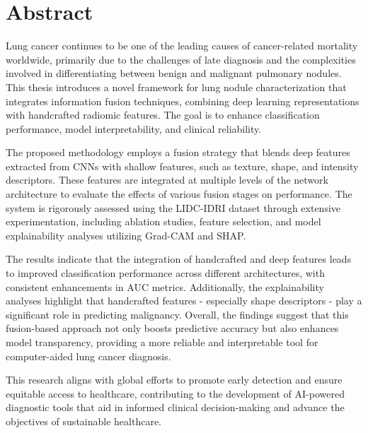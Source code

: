 \chapter*{Abstract}
Lung cancer continues to be one of the leading causes of cancer-related mortality worldwide, primarily due to the challenges of late diagnosis and the complexities involved in differentiating between benign and malignant pulmonary nodules. This thesis introduces a novel framework for lung nodule characterization that integrates information fusion techniques, combining deep learning representations with handcrafted radiomic features. The goal is to enhance classification performance, model interpretability, and clinical reliability.

The proposed methodology employs a fusion strategy that blends deep features extracted from CNNs with shallow features, such as texture, shape, and intensity descriptors. These features are integrated at multiple levels of the network architecture to evaluate the effects of various fusion stages on performance. The system is rigorously assessed using the LIDC-IDRI dataset through extensive experimentation, including ablation studies, feature selection, and model explainability analyses utilizing Grad-CAM and SHAP.

The results indicate that the integration of handcrafted and deep features leads to improved classification performance across different architectures, with consistent enhancements in AUC metrics. Additionally, the explainability analyses highlight that handcrafted features - especially shape descriptors - play a significant role in predicting malignancy. Overall, the findings suggest that this fusion-based approach not only boosts predictive accuracy but also enhances model transparency, providing a more reliable and interpretable tool for computer-aided lung cancer diagnosis.

This research aligns with global efforts to promote early detection and ensure equitable access to healthcare, contributing to the development of AI-powered diagnostic tools that aid in informed clinical decision-making and advance the objectives of sustainable healthcare.